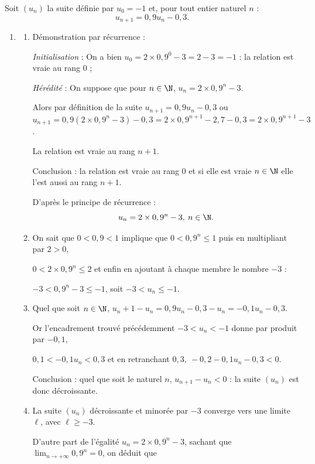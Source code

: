 \medskip

Soit $\left(u_n\right)$ la suite définie par $u_0 = - 1$ et, pour tout entier naturel $n$ :
\[u_{n+1} = 0,9u_n - 0,3.\]

\begin{enumerate}
\item 
	\begin{enumerate}
		\item Démonstration par récurrence :
		
\emph{Initialisation} : On a bien $u_0 = 2 \times 0,9^0 - 3 = 2 - 3 = - 1$ : la relation est vraie au rang $0$ ;
		
\emph{Hérédité} : On suppose que pour $n \in \N$, \: $u_n  = 2 \times 0,9^n - 3$. 

Alors par définition de la suite $u_{n+1} = 0,9u_n - 0,3$ ou $u_{n+1} = 0,9\left(2 \times 0,9^n - 3\right) - 0,3 = 2 \times 0,9^{n+1} - 2,7 - 0,3 = 2 \times 0,9^{n+1} - 3$.

La relation est vraie au rang $n + 1$.

Conclusion : la relation est vraie au rang 0 et si elle est vraie $n \in \N$ elle l'est aussi au rang $n + 1$.

D'après le principe de récurrence :
\[u_n  = 2 \times 0,9^n - 3, \:	n \in \N.\]
\item On sait que $0 < 0,9 < 1$ implique que $0 < 0,9^n \leqslant 1$ puis en multipliant par $2 > 0$,

$0 < 2 \times 0,9^n \leqslant 2$ et enfin  en ajoutant à chaque membre le nombre $- 3$ :

$- 3 < 0,9^n - 3 \leqslant - 1$, soit $- 3 < u_n \leqslant - 1$.
		\item Quel que soit $n \in \N$, \: $u_n+1 - u_n = 0,9u_n - 0,3 - u_n = - 0,1u_n - 0,3$.
		
Or l'encadrement trouvé précédemment $- 3 < u_n < - 1$ donne par produit par $- 0,1$, 
		
$ 0,1 < - 0,1u_n < 0,3$ et en retranchant $0,3, \: -0,2 - 0,1u_n - 0,3  < 0$.
		
Conclusion : quel que soit le naturel $n$, \: $u_{n+1} - u_n < 0$ : la suite $\left(u_n\right)$ est donc décroissante.
		\item 	La suite $\left(u_n\right)$ décroissante et minorée par $-3$ converge vers une limite $\ell$, avec $\ell\geqslant - 3$.
		
D'autre part de l'égalité $u_n  = 2 \times 0,9^n - 3$, sachant que $\displaystyle\lim_{n \to + \infty} 0,9^n = 0$, on déduit que 


\end{enumerate}
\end{enumerate}
